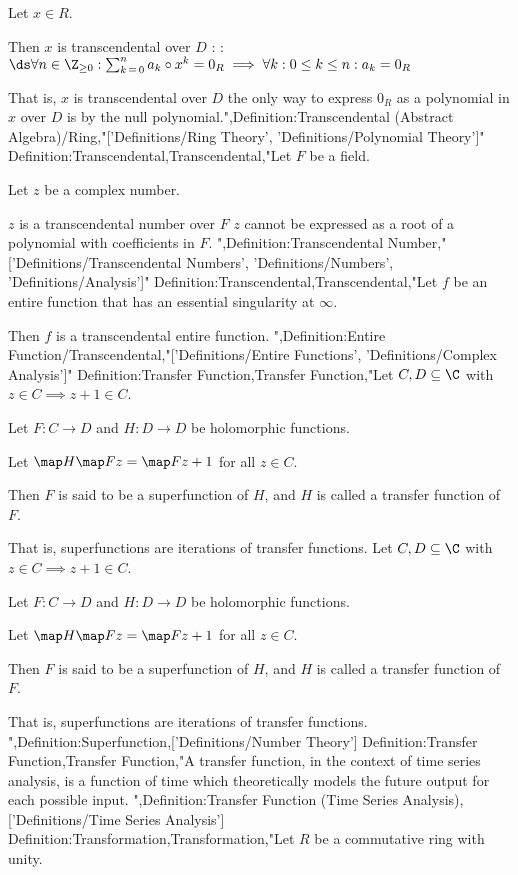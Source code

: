 Let $x \in R$.


Then $x$ is transcendental over $D$ :
:$\ds \forall n \in \Z_{\ge 0}: \sum_{k \mathop = 0}^n a_k \circ x^k = 0_R \implies \forall k: 0 \le k \le n: a_k = 0_R$


That is, $x$ is transcendental over $D$  the only way to express $0_R$ as a polynomial in $x$ over $D$ is by the null polynomial.",Definition:Transcendental (Abstract Algebra)/Ring,"['Definitions/Ring Theory', 'Definitions/Polynomial Theory']"
Definition:Transcendental,Transcendental,"Let $F$ be a field.

Let $z$ be a complex number.

$z$ is a transcendental number over $F$  $z$ cannot be expressed as a root of a polynomial with coefficients in $F$.
",Definition:Transcendental Number,"['Definitions/Transcendental Numbers', 'Definitions/Numbers', 'Definitions/Analysis']"
Definition:Transcendental,Transcendental,"Let $f$ be an entire function that has an essential singularity at $\infty$.

Then $f$ is a transcendental entire function.
",Definition:Entire Function/Transcendental,"['Definitions/Entire Functions', 'Definitions/Complex Analysis']"
Definition:Transfer Function,Transfer Function,"Let $C, D \subseteq \C$ with $z \in C \implies z + 1 \in C$.

Let $F: C \to D$ and $H: D \to D$ be holomorphic functions.

Let $\map H {\map F z} = \map F {z + 1}$ for all $z \in C$.

Then $F$ is said to be a superfunction of $H$, and $H$ is called a transfer function of $F$.

That is, superfunctions are iterations of transfer functions.
Let $C, D \subseteq \C$ with $z \in C \implies z + 1 \in C$.

Let $F: C \to D$ and $H: D \to D$ be holomorphic functions.

Let $\map H {\map F z} = \map F {z + 1}$ for all $z \in C$.

Then $F$ is said to be a superfunction of $H$, and $H$ is called a transfer function of $F$.

That is, superfunctions are iterations of transfer functions.
",Definition:Superfunction,['Definitions/Number Theory']
Definition:Transfer Function,Transfer Function,"A transfer function, in the context of time series analysis, is a function of time which theoretically models the future output for each possible input.
",Definition:Transfer Function (Time Series Analysis),['Definitions/Time Series Analysis']
Definition:Transformation,Transformation,"Let $R$ be a commutative ring with unity.

